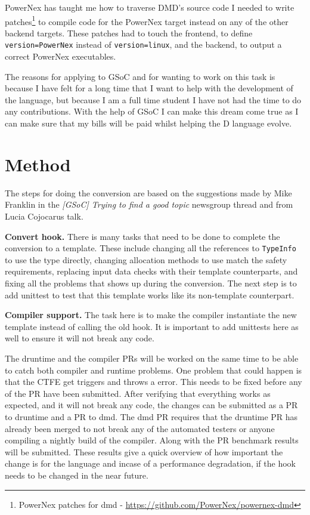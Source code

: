 \documentclass[10pt,a4paper]{article}
\begin{document}
PowerNex has taught me how to traverse DMD’s source code I needed to write 
patches\footnote{PowerNex patches for dmd - \url{https://github.com/PowerNex/powernex-dmd}} to compile code for the PowerNex target instead on any of the other 
backend targets. These patches had to touch the frontend, to define 
\texttt{version=PowerNex} instead of \texttt{version=linux}, and 
the backend, to output a correct PowerNex executables.

The reasons for applying to GSoC and for wanting to work on this task is because 
I have felt for a long time that I want to help with the development of the 
language, but because I am a full time student I have not had the time to do any 
contributions. With the help of GSoC I can make this dream come true as I can 
make sure that my bills will be paid whilst helping the D language evolve.

\section{Method}
The steps for doing the conversion are based on the suggestions made by Mike 
Franklin in the \textit{[GSoC] Trying to find a good topic} newsgroup thread\cite{Suggestions} and 
from Lucia Cojocarus talk\cite{GenericLightweightRuntime}. 

\textbf{Convert hook.}  There is many tasks that need to be done to complete the 
conversion to a template. These include changing all the references to 
\texttt{TypeInfo} to use the type directly, changing allocation methods 
to use match the safety requirements, replacing input data checks with their 
template counterparts, and fixing all the problems that shows up during the 
conversion. The next step is to add unittest to test that this template works 
like its non-template counterpart.

\textbf{Compiler support.} The task here is to make the compiler instantiate the 
new template instead of calling the old hook. It is important to add unittests 
here as well to ensure it will not break any code.

The druntime and the compiler PRs will be worked on the same time to be able to 
catch both compiler and runtime problems. One problem that could happen is that 
the CTFE get triggers and throws a error. This needs to be fixed before any of 
the PR have been submitted. After verifying that everything works as expected, 
and it will not break any code, the changes can be submitted as a PR to druntime 
and a PR to dmd. The dmd PR requires that the druntime PR has already been 
merged to not break any of the automated testers or anyone compiling a nightly 
build of the compiler. Along with the PR benchmark results will be submitted. 
These results give a quick overview of how important the change is for the 
language and incase of a performance degradation, if the hook needs to be 
changed in the near future.
\end{document}
